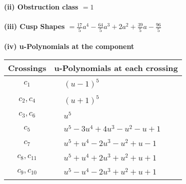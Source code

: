 \documentclass[1p]{elsarticle_modified}
\theoremstyle{definition}
\begin{document}
\flushleft \textbf{(ii) Obstruction class $= 1$}\\~\\
\flushleft \textbf{(iii) Cusp Shapes $= \frac{17}{5} a^4-\frac{64}{5} a^3+2 a^2+\frac{39}{5} a-\frac{96}{5}$}\\~\\
\newpage\renewcommand{\arraystretch}{1}
\flushleft \textbf{(iv) u-Polynomials at the component}\newline \\
\begin{tabular}{m{50pt}|m{274pt}}
Crossings & \hspace{64pt}u-Polynomials at each crossing \\
\hline $$\begin{aligned}c_{1}\end{aligned}$$&$\begin{aligned}
&(u-1)^5
\end{aligned}$\\
\hline $$\begin{aligned}c_{2},c_{4}\end{aligned}$$&$\begin{aligned}
&(u+1)^5
\end{aligned}$\\
\hline $$\begin{aligned}c_{3},c_{6}\end{aligned}$$&$\begin{aligned}
&u^5
\end{aligned}$\\
\hline $$\begin{aligned}c_{5}\end{aligned}$$&$\begin{aligned}
&u^5-3 u^4+4 u^3- u^2- u+1
\end{aligned}$\\
\hline $$\begin{aligned}c_{7}\end{aligned}$$&$\begin{aligned}
&u^5+u^4-2 u^3- u^2+u-1
\end{aligned}$\\
\hline $$\begin{aligned}c_{8},c_{11}\end{aligned}$$&$\begin{aligned}
&u^5+u^4+2 u^3+u^2+u+1
\end{aligned}$\\
\hline $$\begin{aligned}c_{9},c_{10}\end{aligned}$$&$\begin{aligned}
&u^5- u^4-2 u^3+u^2+u+1
\end{aligned}$\\
\hline
\end{tabular}\\~\\
\end{document}
